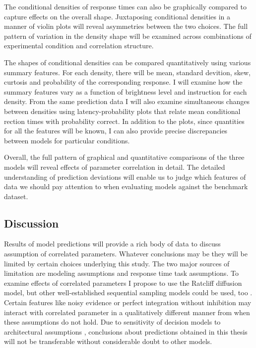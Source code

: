 \documentclass[12pt]{report}
\begin{document}
The conditional densities of response times can also be graphically compared to capture effects on the overall shape. Juxtaposing conditional densities in a manner of violin plots will reveal asymmetries between the two choices. The full pattern of variation in the density shape will be examined across combinations of experimental condition and correlation structure.

The shapes of conditional densities can be compared quantitatively using various summary features. For each density, there will be mean, standard devition, skew, curtosis and probability of the corresponding response. I will examine how the summary features vary as a function of brightness level and instruction for each density. From the same prediction data I will also examine simultaneous changes between densities using latency-probability plots that relate mean conditional rection times with probability correct. In addition to the plots, since quantities for all the features will be known, I can also provide precise discrepancies between models for particular conditions.

Overall, the full pattern of graphical and quantitative comparisons of the three models will reveal effects of parameter correlation in detail. The detailed understanding of prediction deviations will enable us to judge which features of data we should pay attention to when evaluating models against the benchmark dataset.

\subsection{Discussion}
Results of model predictions will provide a rich body of data to discuss assumption of correlated parameters. Whatever conclusions may be they will be limited by certain choices underlying this study. The two major sources of limitation are modeling assumptions and response time task assumptions. To examine effects of correlated parameters I propose to use the Ratcliff diffusion model, but other well-established sequential sampling models could be used, too \citep{UshMcc2001,BroHea2008}. Certain features like noisy evidence or perfect integration without inhibition may interact with correlated parameter in a qualitatively different manner from when these assumptions do not hold. Due to sensitivity of decision models to architectural assumptions \citep{Luc1986,RatSmi2004}, conclusions about predictions obtained in this thesis will not be transferable without considerable doubt to other models.
\end{document}
